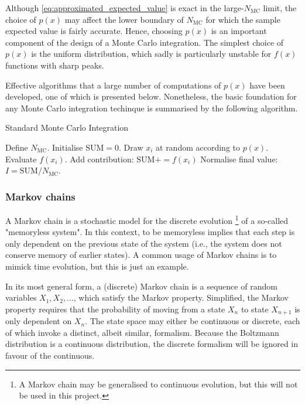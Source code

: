 \documentclass[nofootinbib,reprint,english]{revtex4-1}
\begin{document}
Although \eqref{eq:approximated_expected_value} is exact in the large-\(N_\text{MC}\) limit, the choice of \(p(x)\) may affect the lower boundary of \(N_\text{MC}\) for which the sample expected value is fairly accurate. Hence, choosing \(p(x)\) is an important component of the design of a Monte Carlo integration. The simplest choice of \(p(x)\) is the uniform distribution, which sadly is particularly unstable for \(f(x)\) functions with sharp peaks.

Effective algorithms that a large number of computations of \(p(x)\) have been developed, one of which is presented below. Nonetheless, the basic foundation for any Monte Carlo integration techinque is summarised by the following algorithm.
\begin{algorithm}[H]
\caption{Standard Monte Carlo Integration}\label{algo:standard_Monte_Carlo}
\begin{algorithmic}[1]
\State Define \(N_\text{MC}\).
\State Initialise \(\text{SUM}=0\).
	\State Draw \(x_i\) at random according to \(p(x)\).
	\State Evaluate \(f(x_i)\).
	\State Add contribution: \(\text{SUM}\mathrel{{+}{=}}f(x_i)\)
\EndFor
\State Normalise final value: \(I=\text{SUM}/N_\text{MC}\).
\end{algorithmic}
\end{algorithm}

\subsubsection{Markov chains}
A Markov chain is a stochastic model for the discrete evolution \footnote{A Markov chain may be generalised to continuous evolution, but this will not be used in this project.} of a so-called "memoryless system". In this context, to be memoryless implies that each step is only dependent on the previous state of the system (i.e., the system does not conserve memory of earlier states). A common usage of Markov chains is to mimick time evolution, but this is just an example.

In its most general form, a (discrete) Markov chain is a sequence of random variables \(X_1,X_2,\ldots\), which satisfy the Markov property. Simplified, the Markov property requires that the probability of moving from a state \(X_n\) to state \(X_{n+1}\) is only dependent on \(X_n\). The state space may either be continuous or discrete, each of which invoke a distinct, albeit similar, formalism. Because the Boltzmann distribution is a continuous distribution, the discrete formalism will be ignored in favour of the continuous.
\end{document}
